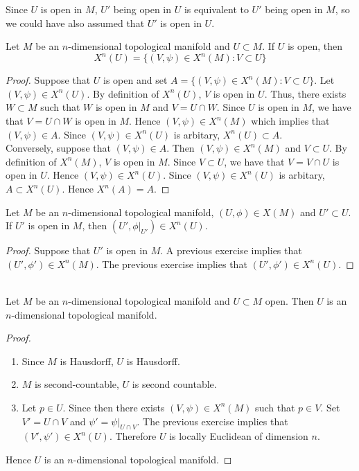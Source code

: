 \documentclass{book}
\begin{document}
	\begin{note}
		Since $U$ is open in $M$, $U'$ being open in $U$ is equivalent to $U'$ being open in $M$, so we could have also assumed that $U'$ is open in $U$.
	\end{note}
	
	\begin{ex}
		Let $M$ be an $n$-dimensional topological manifold and $U \subset M$. If $U$ is open, then 
		$$X^n(U) = \{(V, \psi) \in X^n(M): V \subset U\}$$
	\end{ex}
	
	\begin{proof}
		Suppose that $U$ is open and set $A = \{(V, \psi) \in X^n(M): V \subset U\}$. Let $(V, \psi) \in X^n(U)$. By definition of $X^n(U)$, $V$ is open in $U$. Thus, there exists $W \subset M$ such that $W$ is open in $M$ and $V = U \cap W$. Since $U$ is open in $M$, we have that $V = U \cap W$ is open in $M$. Hence $(V, \psi) \in X^n(M)$ which implies that $(V, \psi) \in A$. Since $(V, \psi) \in X^n(U)$ is arbitary, $X^n(U) \subset A$. \\
		Conversely, suppose that $(V, \psi) \in A$. Then $(V, \psi) \in X^n(M)$ and $V \subset U$. By definition of $X^n(M)$, $V$ is open in $M$. Since $V \subset U$, we have that $V = V \cap U$ is open in $U$. Hence $(V, \psi) \in X^n(U)$. Since $(V, \psi) \in X^n(U)$ is arbitary, $A \subset X^n(U)$. Hence $X^n(A) = A$.
	\end{proof}
	
	\begin{ex}
		Let $M$ be an $n$-dimensional topological manifold, $(U, \phi) \in X(M)$ and $U' \subset U$. If $U'$ is open in $M$, then $(U', \phi|_{U'}) \in X^n(U)$. 
	\end{ex}
	
	\begin{proof}
		Suppose that $U'$ is open in $M$. A previous exercise implies that $(U', \phi') \in X^n(M)$. The previous exercise implies that $(U', \phi') \in X^n(U)$.
	\end{proof}
	
	\begin{ex} \\
		Let $M$ be an $n$-dimensional topological manifold and $U \subset M$ open. Then $U$ is an $n$-dimensional topological manifold. 
	\end{ex}
	
	\begin{proof} \
		\begin{enumerate}
			\item Since $M$ is Hausdorff, $U$ is Hausdorff.
			\item $M$ is second-countable, $U$ is second countable. 
			\item Let $p \in U$. Since then there exists $(V, \psi) \in X^n(M)$ such that $p \in V$. Set $V' = U \cap V$ and $\psi' = \psi|_{U \cap V}$. The previous exercise implies that $(V', \psi') \in X^n(U)$. Therefore $U$ is locally Euclidean of dimension $n$.
		\end{enumerate}
		Hence $U$ is an $n$-dimensional topological manifold.
	\end{proof}
\end{document}
